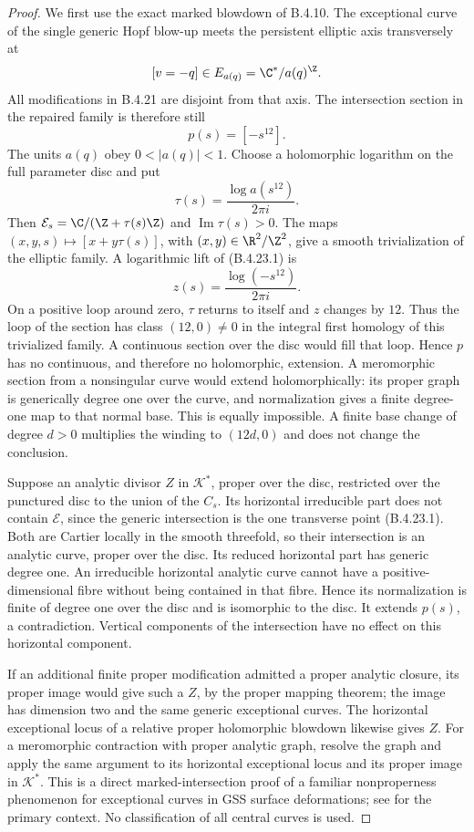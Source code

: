 \begin{proof}
We first use the exact marked blowdown of B.4.10.
The exceptional curve of the single generic Hopf blow-up
meets the persistent elliptic axis transversely at
\[
 [v=-q]\in E_{a(q)}=\C^*/a(q)^{\Z}.
\]
All modifications in B.4.21 are disjoint from that axis.
The intersection section in the repaired family is therefore
still
\[
 p(s)=[-s^{12}].                                      \tag{B.4.23.1}
\]
The units $a(q)$ obey $0<|a(q)|<1$. Choose a holomorphic
logarithm on the full parameter disc and put
\[
 \tau(s)=\frac{\log a(s^{12})}{2\pi i}.
\]
Then $\mathcal E_s=\C/(\Z+\tau(s)\Z)$ and
$\operatorname{Im}\tau(s)>0$. The maps
$(x,y,s)\mapsto[x+y\tau(s)]$, with $(x,y)\in\R^2/\Z^2$,
give a smooth trivialization of the elliptic family.
A logarithmic lift of (B.4.23.1) is
\[
 z(s)=\frac{\log(-s^{12})}{2\pi i}.
\]
On a positive loop around zero, $\tau$ returns to itself
and $z$ changes by $12$. Thus the loop of the section has
class $(12,0)\ne0$ in the integral first homology of this
trivialized family. A continuous section over the disc
would fill that loop. Hence $p$ has no continuous, and
therefore no holomorphic, extension. A meromorphic section
from a nonsingular curve would extend holomorphically:
its proper graph is generically degree one over the curve,
and normalization gives a finite degree-one map to that
normal base. This is equally impossible. A finite base
change of degree $d>0$ multiplies the winding to $(12d,0)$
and does not change the conclusion.

Suppose an analytic divisor $Z$ in $\mathcal K^*$, proper
over the disc, restricted over the punctured disc to the
union of the $C_s$. Its horizontal irreducible part does
not contain $\mathcal E$, since the generic intersection
is the one transverse point (B.4.23.1). Both are Cartier
locally in the smooth threefold, so their intersection
is an analytic curve, proper over the disc. Its reduced
horizontal part has generic degree one. An irreducible
horizontal analytic curve cannot have a positive-dimensional
fibre without being contained in that fibre. Hence its
normalization is finite of degree one over the disc and
is isomorphic to the disc. It extends $p(s)$, a
contradiction. Vertical components of the intersection
have no effect on this horizontal component.

If an additional finite proper modification admitted a
proper analytic closure, its proper image would give
such a $Z$, by the proper mapping theorem; the image has
dimension two and the same generic exceptional curves.
The horizontal exceptional locus of a relative proper
holomorphic blowdown likewise gives $Z$. For a meromorphic
contraction with proper analytic graph, resolve the graph
and apply the same argument to its horizontal exceptional
locus and its proper image in $\mathcal K^*$.
This is a direct marked-intersection proof of a familiar
nonproperness phenomenon for exceptional curves in GSS
surface deformations; see
\citet[Section 1.2]{DlousskyTeleman2012AB} for the primary
context. No classification of all central curves is used.


\end{proof}
